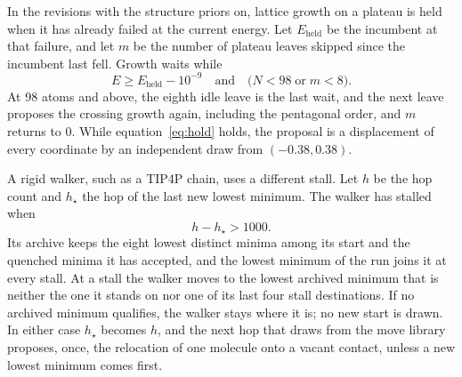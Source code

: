 \documentclass[journal=jctcce,manuscript=article]{achemso}
\begin{document}
In the revisions with the structure priors on, lattice growth on a plateau is
held when it has already failed at the current energy.
Let \(E_{\mathrm{held}}\) be the incumbent at that failure, and let
\(m\) be the number of plateau leaves skipped since the incumbent last
fell.
Growth waits while
\begin{equation}
E \ge E_{\mathrm{held}} - 10^{-9}
\quad\text{and}\quad
\bigl(N < 98 \;\text{or}\; m < 8\bigr).
\label{eq:hold}
\end{equation}
At 98 atoms and above, the eighth idle leave is the last wait, and the next
leave proposes the crossing growth again, including the pentagonal order, and
\(m\) returns to \(0\).
While equation~\ref{eq:hold} holds, the proposal is a displacement of every
coordinate by an independent draw from \((-0.38,0.38)\).

A rigid walker, such as a TIP4P chain, uses a different stall.
Let \(h\) be the hop count and \(h_{\star}\) the hop of the last new
lowest minimum.
The walker has stalled when
\begin{equation}
h - h_{\star} > 1000.
\label{eq:rigid}
\end{equation}
Its archive keeps the eight lowest distinct minima among its start and the
quenched minima it has accepted, and the lowest minimum of the run joins it
at every stall.
At a stall the walker moves to the lowest archived minimum that is neither
the one it stands on nor one of its last four stall destinations.
If no archived minimum qualifies, the walker stays where it is; no new
start is drawn.
In either case \(h_\star\) becomes \(h\), and the next hop that draws from
the move library proposes, once, the relocation of one molecule onto a
vacant contact, unless a new lowest minimum comes first.
\end{document}
